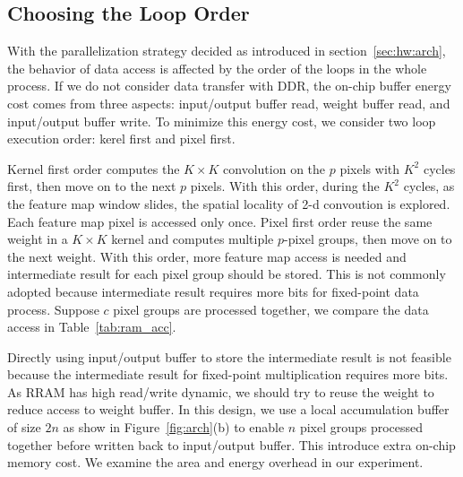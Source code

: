 \subsection{Choosing the Loop Order}
With the parallelization strategy decided as introduced in section~\ref{sec:hw:arch}, the behavior of data access is affected by the order of the loops in the whole process. If we do not consider data transfer with DDR, the on-chip buffer energy cost comes from three aspects: input/output buffer read, weight buffer read, and input/output buffer write. To minimize this energy cost, we consider two loop execution order: kerel first and pixel first.

Kernel first order computes the $K\times K$ convolution on the $p$ pixels with $K^2$ cycles first, then move on to the next $p$ pixels. With this order, during the $K^2$ cycles, as the feature map window slides, the spatial locality of 2-d convoution is explored. Each feature map pixel is accessed only once. Pixel first order reuse the same weight in a $K\times K$ kernel and computes multiple $p$-pixel groups, then move on to the next weight. With this order, more feature map access is needed and intermediate result for each pixel group should be stored. This is not commonly adopted because intermediate result requires more bits for fixed-point data process. Suppose $c$ pixel groups are processed together, we compare the data access in Table~\ref{tab:ram_acc}. 



Directly using input/output buffer to store the intermediate result is not feasible because the intermediate result for fixed-point multiplication requires more bits. As RRAM has high read/write dynamic, we should try to reuse the weight to reduce access to weight buffer. In this design, we use a local accumulation buffer of size $2n$ as show in Figure~\ref{fig:arch}(b) to enable $n$ pixel groups processed together before written back to input/output buffer. This introduce extra on-chip memory cost. We examine the area and energy overhead in our experiment.
